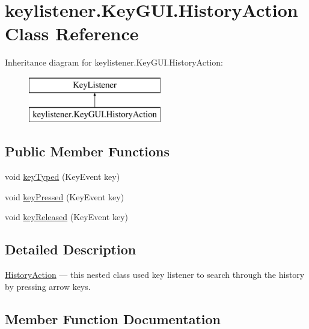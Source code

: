 \hypertarget{classkeylistener_1_1_key_g_u_i_1_1_history_action}{}\section{keylistener.\+Key\+G\+U\+I.\+History\+Action Class Reference}
\label{classkeylistener_1_1_key_g_u_i_1_1_history_action}
Inheritance diagram for keylistener.\+Key\+G\+U\+I.\+History\+Action\+:\begin{figure}[H]
\begin{center}
\leavevmode
\includegraphics[height=2.000000cm]{classkeylistener_1_1_key_g_u_i_1_1_history_action}
\end{center}
\end{figure}
\subsection*{Public Member Functions}
\begin{DoxyCompactItemize}
\item 
void \hyperlink{classkeylistener_1_1_key_g_u_i_1_1_history_action_aff4b5c1bcb45a0c6a30fdd9497528f86}{key\+Typed} (Key\+Event key)
\item 
void \hyperlink{classkeylistener_1_1_key_g_u_i_1_1_history_action_a6d959620475701d599468f0c40acbd63}{key\+Pressed} (Key\+Event key)
\item 
void \hyperlink{classkeylistener_1_1_key_g_u_i_1_1_history_action_a1cf2781870484e23d67b4e429c1c2209}{key\+Released} (Key\+Event key)
\end{DoxyCompactItemize}


\subsection{Detailed Description}
\hyperlink{classkeylistener_1_1_key_g_u_i_1_1_history_action}{History\+Action} --- this nested class used key listener to search through the history by pressing arrow keys. 

\subsection{Member Function Documentation}
\mbox{\label{classkeylistener_1_1_key_g_u_i_1_1_history_action_a6d959620475701d599468f0c40acbd63}} 
